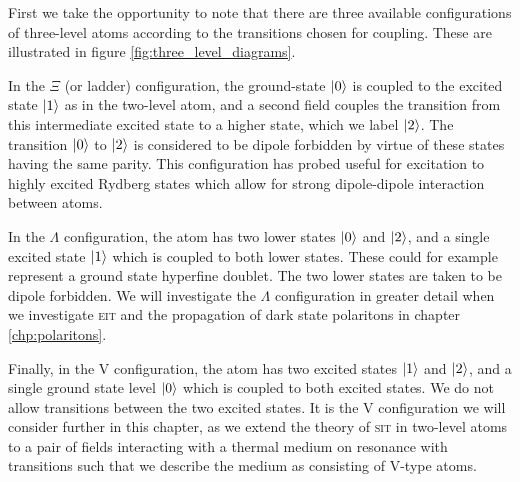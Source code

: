     First we take the opportunity to note that there are three available
    configurations of three-level atoms according to the transitions chosen for
    coupling. These are illustrated in figure \ref{fig:three_level_diagrams}.

    In the $\Xi$ (or ladder) configuration, the ground-state $\Ket{0}$ is
    coupled to the excited state $\Ket{1}$ as in the two-level atom, and a
    second field couples the transition from this intermediate excited state to
    a higher state, which we label $\Ket{2}$. The transition $\Ket{0}$ to
    $\Ket{2}$ is considered to be dipole forbidden by virtue of these states
    having the same parity. This configuration has probed useful for excitation
    to highly excited Rydberg states which allow for strong dipole-dipole
    interaction between atoms.\cite{Pritchard2010}

    In the $\Lambda$ configuration, the atom has two lower states $\Ket{0}$ and
    $\Ket{2}$, and a single excited state $\Ket{1}$ which is coupled to both
    lower states. These could for example represent a ground state hyperfine
    doublet. The two lower states are taken to be dipole forbidden. We will
    investigate the $\Lambda$ configuration in greater detail when we
    investigate \textsc{eit} and the propagation of dark state polaritons in
    chapter \ref{chp:polaritons}.

    Finally, in the V configuration, the atom has two excited states $\Ket{1}$
    and $\Ket{2}$, and a single ground state level $\Ket{0}$ which is coupled to
    both excited states. We do not allow transitions between the two excited
    states. It is the V configuration we will consider further in this chapter,
    as we extend the theory of \textsc{sit} in two-level atoms to a pair of
    fields interacting with a thermal medium on resonance with transitions such
    that we describe the medium as consisting of V-type atoms.

